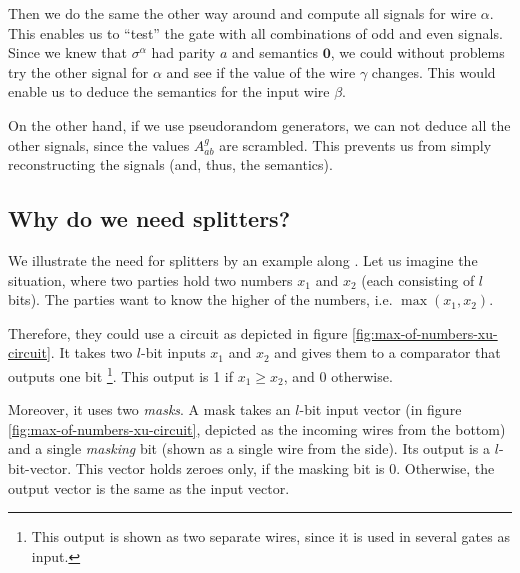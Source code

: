 Then we do the same the other way around and compute all signals for wire $\alpha$. This enables us to ``test'' the gate with all combinations of odd and even signals. Since we knew that $\sigma^\alpha$ had parity $a$ and semantics $\mathbf{0}$, we could without problems try the other signal for $\alpha$ and see if the value of the wire $\gamma$ changes. This would enable us to deduce the semantics for the input wire $\beta$.

On the other hand, if we use pseudorandom generators, we can not deduce all the other signals, since the values $A^g_{ab}$ are scrambled. This prevents us from simply reconstructing the signals (and, thus, the semantics).

\subsection{Why do we need splitters?}
\label{sec:appendix-splitters}

We illustrate the need for splitters by an example along \cite{Xu:2004:MAS:1023552}. Let us imagine the situation, where two parties hold two numbers $x_1$ and $x_2$ (each consisting of $l$ bits). The parties want to know the higher of the numbers, i.e. $\max(x_1,x_2)$.

Therefore, they could use a circuit as depicted in figure \ref{fig:max-of-numbers-xu-circuit}. It takes two $l$-bit inputs $x_1$ and $x_2$ and gives them to a comparator that outputs one bit \footnote{This output is shown as two separate wires, since it is used in several gates as input.}. This output is 1 if $x_1\geq x_2$, and 0 otherwise.

Moreover, it uses two \emph{masks}. A mask takes an $l$-bit input vector (in figure \ref{fig:max-of-numbers-xu-circuit}, depicted as the incoming wires from the bottom) and a single \emph{masking} bit (shown as a single wire from the side). Its output is a $l$-bit-vector. This vector holds zeroes only, if the masking bit is 0. Otherwise, the output vector is the same as the input vector.

